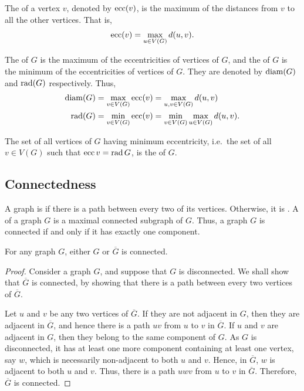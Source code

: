 The  of a vertex $v$, denoted by $\operatorname{ecc}(v)$, is the maximum of the distances from $v$ to all the other vertices. That is,
\begin{equation*}
    \operatorname{ecc}(v) = \max_{u \in V(G)} d(u, v) .
\end{equation*}

The  of $G$ is the maximum of the eccentricities of vertices of $G$, and the  of $G$ is the minimum of the eccentricities of vertices of $G$. They are denoted by $\operatorname{diam}(G)$ and $\operatorname{rad}(G)$ respectively. Thus,
\begin{align*}
    \operatorname{diam}(G) & = \max_{v \in V(G)} \operatorname{ecc}(v)= \max_{u, v \in V(G)} d(u, v) \\
    \operatorname{rad}(G) & = \min_{v \in V(G)}\operatorname{ecc}(v) = \min_{v \in V(G)} \max_{u \in V(G)} d(u, v).
\end{align*}

The set of all vertices of $G$ having minimum eccentricity, i.e.\ the set of all $v \in V(G)$ such that $\operatorname{ecc} v = \operatorname{rad} G$, is the  of $G$.

\subsection{Connectedness}\label{subsec:Connectedness}

A graph is  if there is a path between every two of its vertices. Otherwise, it is . A  of a graph $G$ is a maximal connected subgraph of $G$. Thus, a graph $G$ is connected if and only if it has exactly one component.

\begin{Theorem}\label{thm:GorGCompConn}
For any graph $G$, either $G$ or $\overline G$ is connected.
\end{Theorem}

\begin{proof}
Consider a graph $G$, and suppose that $G$ is disconnected. We shall show that $\overline G$ is connected, by showing that there is a path between every two vertices of $\overline G$.

Let $u$ and $v$ be any two vertices of $\overline G$. If they are not adjacent in $G$, then they are adjacent in $\overline G$, and hence there is a path $uv$ from $u$ to $v$ in $\overline G$. If $u$ and $v$ are adjacent in $G$, then they belong to the same component of $G$. As $G$ is disconnected, it has at least one more component containing at least one vertex, say $w$, which is necessarily non-adjacent to both $u$ and $v$. Hence, in $\overline G$, $w$ is adjacent to both $u$ and $v$. Thus, there is a path $uwv$ from $u$ to $v$ in $\overline G$. Therefore, $\overline G$ is connected.
\end{proof}

